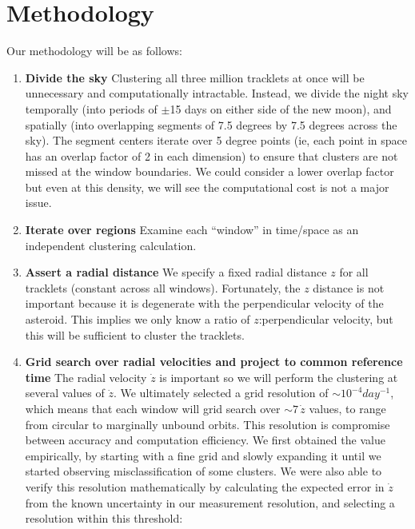 \documentclass[11pt,letter]{article}
\begin{document}
\section*{Methodology}
    Our methodology will be as follows:
\begin{enumerate}
    \item \textbf{Divide the sky}\newline
    Clustering all three million tracklets at once will be unnecessary and computationally intractable.  Instead, we divide the night sky temporally (into periods of $\pm$15 days on either side of the new moon), and spatially (into overlapping segments of 7.5 degrees by 7.5 degrees across the sky).  The segment centers iterate over 5 degree points (ie, each point in space has an overlap factor of 2 in each dimension) to ensure that clusters are not missed at the window boundaries.  We could consider a lower overlap factor but even at this density, we will see the computational cost is not a major issue.
    \item \textbf{Iterate over regions}\newline
    Examine each ``window'' in time/space as an independent clustering calculation.
    \item \textbf{Assert a radial distance}\newline
    We specify a fixed radial distance $z$ for all tracklets (constant across all windows).  Fortunately, the $z$ distance is not important because it is degenerate with the perpendicular velocity of the asteroid.  This implies we only know a ratio of $z$:perpendicular velocity, but this will be sufficient to cluster the tracklets.
    \item \textbf{Grid search over radial velocities and project to common reference time}\newline
    The radial velocity $\dot{z}$ is important so we will perform the clustering at several values of $\dot{z}$.  We ultimately selected a grid resolution of $\sim10^{-4} day^{-1}$, which means that each window will grid search over $\sim7\,\dot{z}$ values, to range from circular to marginally unbound orbits.\newline
    This resolution is compromise between accuracy and computation efficiency.  We first obtained the value empirically, by starting with a fine grid and slowly expanding it until we started observing misclassification of some clusters.  We were also able to verify this resolution mathematically by calculating the expected error in $\dot{z}$ from the known uncertainty in our measurement resolution, and selecting a resolution within this threshold:
    

\end{enumerate}
\end{document}
